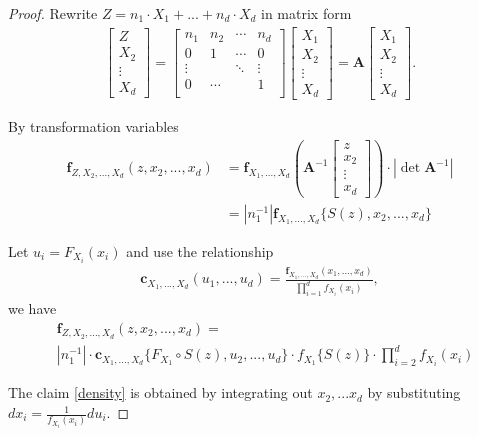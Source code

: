 \begin{proof}
   Rewrite $Z = n_1 \cdot X_1 + ... +  n_d \cdot X_d $ in matrix form
   \begin{align}
      \begin{bmatrix}
      Z \\ X_2 \\ \vdots \\ X_d
      \end{bmatrix}
      = \begin{bmatrix}
      n_1    & n_2   & \cdots & n_d     \\
      0      & 1     &  \cdots & 0       \\
      \vdots &       & \ddots & \vdots \\
      0      & \cdots &       & 1  \\
      \end{bmatrix}
      \begin{bmatrix}
         X_1 \\ X_2 \\ \vdots \\ X_d
      \end{bmatrix}
      = \bm{A}
      \begin{bmatrix}
         X_1 \\ X_2 \\ \vdots \\ X_d
      \end{bmatrix}.
      \end{align} \medskip

   By transformation variables
   \begin{align}
      \bm{f}_{Z,X_2,...,X_d}(z, x_2, ...,x_d) &= \bm{f}_{X_1,...,X_d}\left( \bm{A}^{-1}
      \begin{bmatrix}
         z \\ x_2 \\ \vdots \\ x_d
      \end{bmatrix}
      \right)  \cdot |\det \bm{A}^{-1}| \\
      &= \left| n_1^{-1} \right| \bm{f}_{X_1,...,X_d}\{S(z), x_2,...,x_d\}
      \end{align} \medskip

   Let $u_i = F_{X_i}(x_i)$ and
   use the relationship
   \begin{align}
      \bm{c}_{X_1,...,X_d}(u_1, ..., u_d)=\frac{\bm{f}_{X_1,...,X_d}(x_1,...,x_d)}{\prod_{i=1}^d f_{X_i}(x_i)},
   \end{align}
   we have
   \begin{align}
     & \bm{f}_{Z,X_2,...,X_d}(z, x_2, ...,x_d) = \\
      & \left| n_1^{-1} \right| \cdot
      \bm{c}_{X_1,...,X_d}\{F_{X_1} \circ S(z), u_2, ...,  u_d\}  \cdot
      f_{X_1} \{ S(z) \} \cdot
      \prod_{i=2}^d f_{X_i}(x_i)
      \end{align}

   The claim \ref{density} is obtained by integrating out $x_2, ... x_d$ by substituting $dx_i = \frac{1}{f_{X_i}(x_i)}du_i$.
   \end{proof}


